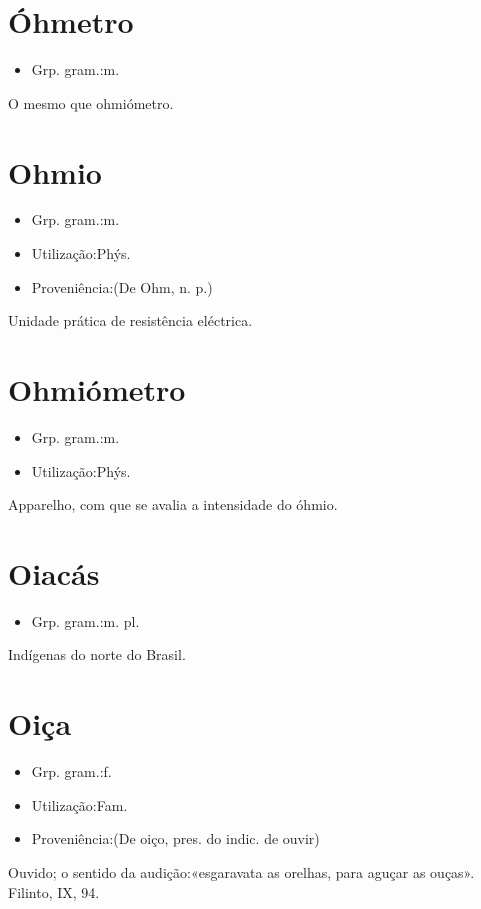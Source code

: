 \section{Óhmetro}
\begin{itemize}
\item {Grp. gram.:m.}
\end{itemize}
O mesmo que \textunderscore ohmiómetro\textunderscore .
\section{Ohmio}
\begin{itemize}
\item {Grp. gram.:m.}
\end{itemize}
\begin{itemize}
\item {Utilização:Phýs.}
\end{itemize}
\begin{itemize}
\item {Proveniência:(De \textunderscore Ohm\textunderscore , n. p.)}
\end{itemize}
Unidade prática de resistência eléctrica.
\section{Ohmiómetro}
\begin{itemize}
\item {Grp. gram.:m.}
\end{itemize}
\begin{itemize}
\item {Utilização:Phýs.}
\end{itemize}
Apparelho, com que se avalia a intensidade do óhmio.
\section{Oiacás}
\begin{itemize}
\item {Grp. gram.:m. pl.}
\end{itemize}
Indígenas do norte do Brasil.
\section{Oiça}
\begin{itemize}
\item {Grp. gram.:f.}
\end{itemize}
\begin{itemize}
\item {Utilização:Fam.}
\end{itemize}
\begin{itemize}
\item {Proveniência:(De \textunderscore oiço\textunderscore , pres. do indic. de \textunderscore ouvir\textunderscore )}
\end{itemize}
Ouvido; o sentido da audição:«\textunderscore esgaravata as orelhas, para aguçar as ouças\textunderscore ». Filinto, IX, 94.
